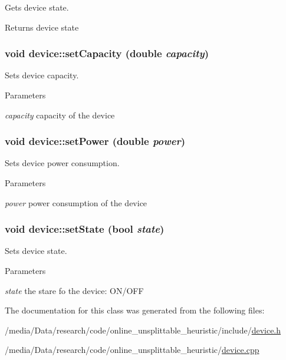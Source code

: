 Gets device state. 

\begin{DoxyReturn}{Returns}
device state 
\end{DoxyReturn}
\hypertarget{classdevice_a66b66e2bce25b091d651ee6336f6f40e}{
\subsubsection[{setCapacity}]{\setlength{\rightskip}{0pt plus 5cm}void device::setCapacity (double {\em capacity})}}
\label{classdevice_a66b66e2bce25b091d651ee6336f6f40e}


Sets device capacity. 


\begin{DoxyParams}{Parameters}
\item[{\em capacity}]capacity of the device \end{DoxyParams}
\hypertarget{classdevice_a43b8093ad785d5b5787751a7ede0ae73}{
\subsubsection[{setPower}]{\setlength{\rightskip}{0pt plus 5cm}void device::setPower (double {\em power})}}
\label{classdevice_a43b8093ad785d5b5787751a7ede0ae73}


Sets device power consumption. 


\begin{DoxyParams}{Parameters}
\item[{\em power}]power consumption of the device \end{DoxyParams}
\hypertarget{classdevice_a8479767364d2d7a6e349552eb6bae023}{
\subsubsection[{setState}]{\setlength{\rightskip}{0pt plus 5cm}void device::setState (bool {\em state})}}
\label{classdevice_a8479767364d2d7a6e349552eb6bae023}


Sets device state. 


\begin{DoxyParams}{Parameters}
\item[{\em state}]the stare fo the device: ON/OFF \end{DoxyParams}


The documentation for this class was generated from the following files:\begin{DoxyCompactItemize}
\item 
/media/Data/research/code/online\_\-unsplittable\_\-heuristic/include/\hyperlink{device_8h}{device.h}\item 
/media/Data/research/code/online\_\-unsplittable\_\-heuristic/\hyperlink{device_8cpp}{device.cpp}\end{DoxyCompactItemize}
